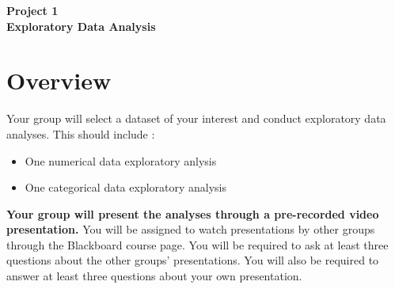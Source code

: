 \documentclass[12pt]{article}
\begin{document}
\begin{center}
\textbf{\Large Project 1 \\ Exploratory Data Analysis } 
\end{center}


\section*{Overview}
Your group will select a dataset of your interest and conduct exploratory data analyses.
This should include :
\begin{itemize}
    \item One numerical data exploratory anlysis
    \item One categorical data exploratory analysis 
\end{itemize} 
\textbf{Your group will present the analyses through a pre-recorded video presentation.}
You will be assigned to watch presentations by other groups through the Blackboard course page. 
You will be required to ask at least three questions about the other groups' presentations. 
You will also be required to answer at least three questions about your own presentation. 
\end{document}
